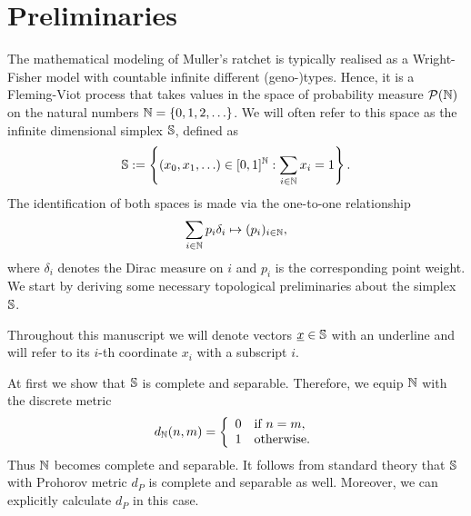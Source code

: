 \chapter{Preliminaries}
The mathematical modeling of Muller's ratchet is typically realised as a Wright-Fisher model 
with countable infinite different (geno-)types. Hence, it is a Fleming-Viot process that takes
values in the space of probability measure $\mathcal{P}(\mathbb{N})$ on the natural numbers $\mathbb{N} = \{
0,1,2,\ldots \}$. We will often refer to this space as the infinite dimensional simplex $\mathbb{S}$, defined as
\[
\mathbb{S} := \left\{ (x_0, x_1, \ldots) \in [0,1]^{\mathbb{N}} : \sum_{i \in \mathbb{N}} x_i = 1
\right\}.
\]
The identification of both spaces is made via the one-to-one relationship
\[
\sum_{i \in \mathbb{N}} p_i \delta_{i} \mapsto (p_i)_{i \in \mathbb{N}},
\]
where $\delta_i$ denotes the Dirac measure on $i$ and $p_i$ is the corresponding point weight.
We start by deriving some necessary topological preliminaries about the
simplex $\mathbb{S}$.

\begin{Notation}
Throughout this manuscript we will denote vectors $\underline{x} \in \mathbb{S}$ with an underline and
will refer to its $i$-th coordinate $x_i$ with a subscript $i$. 
\end{Notation}

\noindent 
At first we show that $\mathbb{S}$ is complete and separable. Therefore, we equip $\mathbb{N}$ with the
discrete metric \[ d_{\mathbb{N}}(n,m) =
\left\{
\begin{array}{ll}
0 & \text{if } n = m, \\
1 & \text{otherwise.}
\end{array}
\right.
\]
Thus $\mathbb{N}$ becomes complete and separable. It follows from standard theory that
$\mathbb{S}$ with Prohorov metric $d_P$ is complete and separable as well.
Moreover, we can explicitly calculate $d_P$ in this case.

